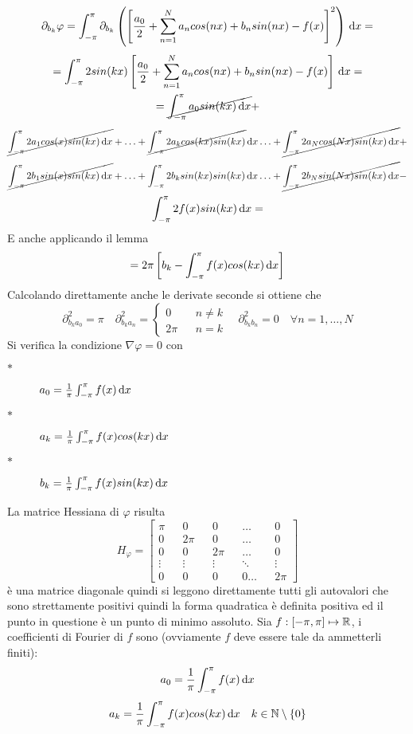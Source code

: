 $$\partial_{b_k}\varphi = \int_{-\pi}^{\pi}\partial_{b_k}\left(\left[\frac{a_0}{2}+\sum\limits_{n=1}^{N}a_{n}cos(nx)+b_{n}sin(nx)-f(x)\right]^2\right)\,\mathrm{d}{x}=$$
$$ = \int_{-\pi}^{\pi} 2sin(kx) \left[\frac{a_0}{2}+\sum\limits_{n=1}^{N}a_{n}cos(nx)+b_{n}sin(nx)-f(x)\right]\,\mathrm{d}{x}=$$
$$ =  \cancel{\int_{-\pi}^{\pi} a_0sin(kx)\,\mathrm{d}{x}} + $$
$$\cancel{\int_{-\pi}^{\pi} 2a_1cos(x)sin(kx)\,\mathrm{d}{x}} +
\ldots +
\cancel{\int_{-\pi}^{\pi} 2a_kcos(kx)sin(kx)}\,\mathrm{d}{x}
\ldots +
\cancel{\int_{-\pi}^{\pi} 2a_Ncos(Nx)sin(kx)\,\mathrm{d}{x}} + $$
$$\cancel{\int_{-\pi}^{\pi} 2b_1sin(x)sin(kx)\,\mathrm{d}{x}} +
\ldots +
\int_{-\pi}^{\pi} 2b_ksin(kx)sin(kx)\,\mathrm{d}{x}
\ldots +
\cancel{\int_{-\pi}^{\pi} 2b_Nsin(Nx)sin(kx)\,\mathrm{d}{x}} - $$
$$\int_{-\pi}^{\pi} 2f(x)sin(kx)\,\mathrm{d}{x} = $$
E anche applicando il lemma
$$=2\pi\left[b_k-\int_{-\pi}^{\pi}f(x)cos(kx)\,\mathrm{d}{x}\right]$$
Calcolando direttamente anche le derivate seconde si ottiene che
$$\partial^2_{b_ka_0}=\pi\quad\partial^2_{b_ka_n}=
\left\{\begin{matrix}
0&&n\ne k\\2\pi&&n=k
\end{matrix}\right.
\quad\partial^2_{b_kb_n}=0\quad\forall n=1,\dotsc,N$$
Si verifica la condizione $\nabla\varphi = 0$ con
\begin{description}
	\item[$\ast$] $a_0=\frac{1}{\pi}\int_{-\pi}^{\pi}f(x)\,\mathrm{d}{x}$
	\item[$\ast$] $a_k=\frac{1}{\pi}\int_{-\pi}^{\pi}f(x)cos(kx)\,\mathrm{d}{x}$
	\item[$\ast$] $b_k=\frac{1}{\pi}\int_{-\pi}^{\pi}f(x)sin(kx)\,\mathrm{d}{x}$
\end{description}
La matrice Hessiana di $\varphi$ risulta $$H_{\varphi}=\left[\begin{matrix}
\pi&&0&&0&&\ldots&&0\\
0&&2\pi&&0&&\ldots&&0\\
0&&0&&2\pi&&\ldots&&0\\
\vdots&&\vdots&&\vdots&&\ddots&&\vdots\\
0&&0&&0&&0\ldots&&2\pi
\end{matrix}\right]$$
è una matrice diagonale quindi si leggono direttamente tutti gli autovalori che sono strettamente positivi quindi la forma quadratica è definita positiva ed il punto in questione è un punto di minimo assoluto.
Sia $f: \left[-\pi,\pi\right] \mapsto \mathbb{R}$, i coefficienti di Fourier di $f$ sono (ovviamente $f$ deve essere tale da ammetterli finiti):
$$a_0=\frac{1}{\pi}\int_{-\pi}^{\pi}f(x)\,\mathrm{d}{x}$$
$$a_k=\frac{1}{\pi}\int_{-\pi}^{\pi}f(x)cos(kx)\,\mathrm{d}{x}\quad k\in\mathbb{N}\setminus{\left\{0\right\}}$$
